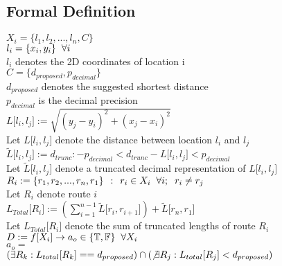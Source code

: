 \documentclass[11pt]{article}
\begin{document}
\subsection{Formal Definition}
\begin{center}
$
X_i = \{l_1,l_2,...,l_n,C\}
$
\\ \vspace{5mm}
$
l_i = \{x_i,y_i\} \hspace{2mm} \forall i
$
\\ \vspace{2mm}
$l_i$ denotes the 2D coordinates of location i
\\ \vspace{5mm}
$
C = \{d_{proposed},p_{decimal}\}
$
\\ \vspace{2mm}
$
d_{proposed}$ denotes the suggested shortest distance
\\ \vspace{1.5mm}
$
p_{decimal}$ is the decimal precision
\\ \vspace{5mm}
$
L\lbrack l_i,l_j \rbrack := \sqrt{(y_j - y_i)^2 + (x_j - x_i)^2}
$
\\ \vspace{2mm}
Let $L\lbrack l_i,l_j \rbrack$ denote the distance between location $l_i$ and $l_j$
\\ \vspace{5mm}
$
\tilde{L} \lbrack l_i,l_j \rbrack :=d_{trunc} : -p_{decimal} < d_{trunc} - L\lbrack l_i,l_j \rbrack < p_{decimal}
$
\\ \vspace{2mm}
Let $\tilde{L}\lbrack l_i,l_j \rbrack$ denote a truncated decimal representation of $L\lbrack l_i,l_j \rbrack$
\\ \vspace{5mm}
$
R_i := \{r_1,r_2,...,r_n,r_1\} \hspace{1.5mm} : \hspace{1.5mm} r_i \in X_i \hspace{2mm} \forall i; \hspace{2mm} r_i \neq r_j
$
\\ \vspace{2mm}
Let $R_i$ denote route $i$
\\ \vspace{5mm}
$
L_{Total}\lbrack R_i \rbrack := (\sum_{i=1}^{n-1} \tilde{L}\lbrack r_i,r_{i+1}\rbrack) + \tilde{L}\lbrack r_n,r_1\rbrack
$
\\ \vspace{2mm}
Let $L_{Total}\lbrack R_i \rbrack$ denote the sum of truncated lengths of route $R_i$
\\ \vspace{5mm}
$
D := f \lbrack X_i \rbrack \rightarrow a_o \in \{\mathbb{T},\mathbb{F}\} \hspace{2mm} \forall X_i
$
\\ \vspace{2mm}
$
a_o =
$
\\ \vspace{2mm}
$
(\exists R_k : L_{total}\lbrack R_k\rbrack == d_{proposed}) \cap (\not \exists R_j :  L_{total}\lbrack R_j \rbrack < d_{proposed})
$
\end{center}
\end{document}
